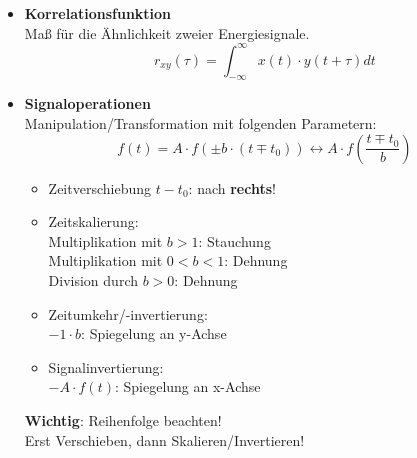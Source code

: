 \begin{itemize}
      \item{\textbf{Korrelationsfunktion}}\\
          {\small Ma{\ss} f\"ur die \"Ahnlichkeit
          zweier Energiesignale.}
              \[
                  r_{xy}(\tau) = \int_{-\infty}^{\infty}x(t)\cdot y(t+\tau) dt
              \]
      \item{\textbf{Signaloperationen}}\\
        {\small Manipulation/Transformation mit folgenden Parametern:}
            \[ \boxed{
				f(t) = A \cdot f(\pm b \cdot (t \mp t_0)) \leftrightarrow A \cdot f\left(\frac{t\mp t_0}{b}\right)
				}
			\]
		 \renewcommand{\labelitemii}{$\bullet$}
          \begin{itemize}
              \item{Zeitverschiebung $t-t_0$: nach \textbf{rechts}}!

              \item{Zeitskalierung:\\
              	Multiplikation mit $b>1$: Stauchung \\
              	Multiplikation mit $0<b<1$: Dehnung \\
              	Division durch $b>0$: Dehnung}

              \item{Zeitumkehr/-invertierung:\\ $-1 \cdot b$: Spiegelung an y-Achse}
              \item{Signalinvertierung:\\
              $-A\cdot f(t)$: Spiegelung an x-Achse}
              
          \end{itemize}
          \textbf{Wichtig}: Reihenfolge beachten!\\
          Erst Verschieben, dann Skalieren/Invertieren!
  \end{itemize}
